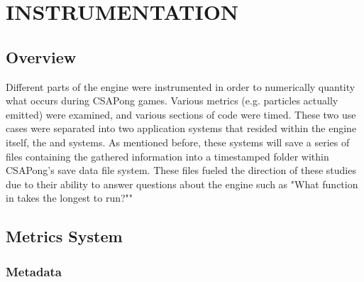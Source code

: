 

\chapter{INSTRUMENTATION}\label{ch:instrumentation}

\section{Overview}\label{sec:instr_overview}

Different parts of the engine were instrumented in order to numerically quantity what occurs during CSAPong games. Various metrics (e.g. particles actually emitted) were examined, and various sections of code were timed. These two use cases were separated into two application systems that resided within the engine itself, the  and  systems. As mentioned before, these systems will save a series of files containing the gathered information into a timestamped folder within CSAPong's save data file system. These files fueled the direction of these studies due to their ability to answer questions about the engine such as "What function in  takes the longest to run?""

\section{Metrics System}\label{sec:instr_metrics_system}

\subsection{Metadata}\label{ssec:instr_metrics_system_metadata}

